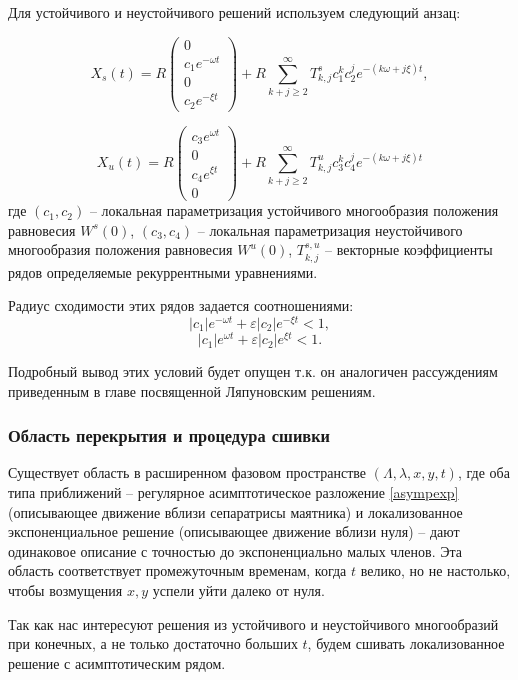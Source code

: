 Для устойчивого и неустойчивого решений используем следующий анзац:

$$X_s(t) = R \begin{pmatrix}
0 \\
c_1 e^{-\omega t}\\
0\\    
c_2 e^{-\xi t}
\end{pmatrix}
+
R \sum_{k+j \geq 2}^\infty T_{k,j}^s c_1^k c_2^j e^{-(k \omega + j \xi)t},
$$

$$X_u(t) = R \begin{pmatrix}
c_3 e^{\omega t}\\
0\\    
c_4 e^{\xi t} \\
0
\end{pmatrix}
+
R \sum_{k+j \geq 2}^\infty T_{k,j}^u c_3^k c_4^j e^{-(k \omega + j \xi)t}
$$
где $(c_1, c_2)$ -- локальная параметризация устойчивого многообразия положения равновесия $W^s(0)$, $(c_3, c_4)$ -- локальная параметризация неустойчивого многообразия положения равновесия $W^u(0)$, $T_{k,j}^{s,u}$ -- векторные коэффициенты рядов определяемые рекуррентными уравнениями.

Радиус сходимости этих рядов задается соотношениями:
$$|c_1| e^{-\omega t} + \varepsilon |c_2| e^{-\xi t} < 1,$$
$$|c_1| e^{\omega t} + \varepsilon  |c_2| e^{\xi t} < 1.$$

Подробный вывод этих условий будет опущен т.к. он аналогичен рассуждениям приведенным в главе посвященной Ляпуновским решениям.

\subsubsection{Область перекрытия и процедура сшивки}

Существует область в расширенном фазовом пространстве $(\Lambda,\lambda,x,y,t)$, где оба типа приближений -- регулярное асимптотическое разложение \eqref{asympexp} (описывающее движение вблизи сепаратрисы маятника) и локализованное экспоненциальное решение (описывающее движение вблизи нуля) -- дают одинаковое описание с точностью до экспоненциально малых членов. Эта область соответствует промежуточным временам, когда $t$ велико, но не настолько, чтобы возмущения $x,y$ успели уйти далеко от нуля.

Так как нас интересуют решения из устойчивого и неустойчивого многообразий при конечных, а не только достаточно больших $t$, будем сшивать локализованное решение с асимптотическим рядом.

